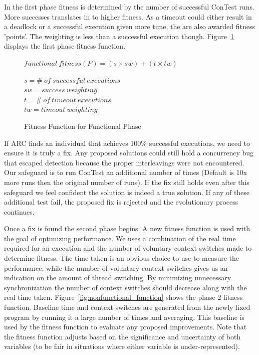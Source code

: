 \documentclass[10pt, conference, compsocconf]{IEEEtran}
\begin{document}
In the first phase fitness is determined by the number of successful ConTest
runs. More successes translates in to higher fitness. As a timeout could either
result in a deadlock or a successful execution given more time, the are also
awarded fitness 'points'. The weighting is less than a successful execution
though. Figure~\ref{fig:functional_fitness} displays the first phase fitness
function.

\begin{figure}
\begin{footnotesize}
\begin{center}
$functional\ fitness(P) = (s \times sw) + (t \times tw)$
\end{center}
\end{footnotesize}
\begin{tiny}
\begin{center}
$s = \#\ of\ successful\ executions$ \\
$sw = success\ weighting$ \\
$t = \#\ of\ timeout\ executions$ \\
$tw = timeout\ weighting$
\end{center}
\end{tiny}
\caption{Fitness Function for Functional Phase}
\label{fig:functional_fitness}
\end{figure}

If ARC finds an individual that achieves 100\% successful executions, we need to ensure it is truly a fix. Any proposed solutions could still hold a
concurrency bug that escaped detection because the proper interleavings were not encountered. Our safeguard is to run ConTest an additional number of times (Default is 10x more runs then the original number of runs). If the fix still holds even after this safeguard we feel confident the solution is indeed a true solution. If any of these additional test fail, the proposed fix is rejected and the evolutionary process continues.

Once a fix is found the second phase begins.  A new fitness function is used
with the goal of optimizing performance.  We uses a combination of the real time required for an execution and the number of voluntary context switches made to determine fitness.
The time taken is an obvious choice to use to measure the performance, while the number of voluntary context switches gives us an indication on the amount of thread switching. By minimizing unnecessary synchronization the number of context switches should decrease along with the real time taken.
Figure~\ref{fig:nonfunctional_function} shows the phase 2 fitness function.
Baseline time and context switches are generated from the newly fixed program by running it a large number of times and averaging. This baseline is used by the fitness function to evaluate any proposed improvements. Note that the fitness function adjusts based on the significance and uncertainty of both variables (to be fair in situations where either variable is under-represented).
\end{document}
